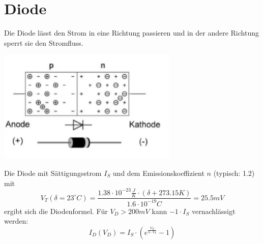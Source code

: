 \section{Diode}\label{dioden}
Die Diode lässt den Strom in eine Richtung passieren und in der andere Richtung sperrt sie den Stromfluss.
\begin{center}
	\includegraphics[width=0.4\columnwidth]{Images/diode_grafik}
\end{center}
Die Diode mit Sättigungsstrom $I_S$ und dem Emissionskoeffizient $n$ (typisch: 1.2) mit 
\[V_T(\delta = 23^\circ C) = \frac{1.38\cdot10^{-23}\frac{J}{K}\cdot (\delta + 273.15K)}{1.6\cdot10^{-19}C} = 25.5mV\]
ergibt sich die Diodenformel. Für $V_D > 200mV$ kann $-1\cdot I_S$ vernachlässigt werden:
\[
I_D(V_D) = I_S \cdot \left(e^{\frac{V_D}{n\cdot V_T}}- 1\right)
\]


